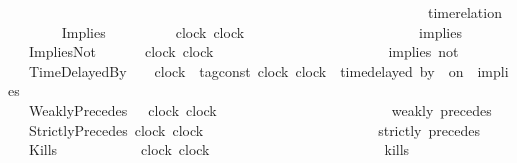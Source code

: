 \begin{isabellebody}
\ \ \ \ \ \ \ \ \ \ \ \ \ \ \ \ \ \ \ \ \ \ \ \ \ \ \ \ \ \ \ \ \ \ \ \ \ \ \ \ \ \ \ \ \ \ \ \ \ \ \ \ \ \ \ \ \ \ \ \ {\isacharparenleft}{\isachardoublequoteopen}time{\isacharminus}relation\ {\isasymlfloor}{\isacharunderscore}{\isacharcomma}\ {\isacharunderscore}{\isasymrfloor}\ {\isasymin}\ {\isacharunderscore}{\isachardoublequoteclose}\ {}{}{\isacharparenright}\isanewline
\ \ {\isacharbar}\ Implies\ \ \ \ \ \ \ \ \ \ {\isacartoucheopen}clock{\isacartoucheclose}\ {\isacartoucheopen}clock{\isacartoucheclose}\ \ \ \ \ \ \ \ \ \ \ \ \ \ \ \ \ \ \ \ \ \ \ \ {\isacharparenleft}\ {\isachardoublequoteopen}implies{\isachardoublequoteclose}\ {}{}{\isacharparenright}\isanewline
\ \ {\isacharbar}\ ImpliesNot\ \ \ \ \ \ \ {\isacartoucheopen}clock{\isacartoucheclose}\ {\isacartoucheopen}clock{\isacartoucheclose}\ \ \ \ \ \ \ \ \ \ \ \ \ \ \ \ \ \ \ \ \ \ \ \ {\isacharparenleft}\ {\isachardoublequoteopen}implies\ not{\isachardoublequoteclose}\ {}{}{\isacharparenright}\isanewline
\ \ {\isacharbar}\ TimeDelayedBy\ \ \ \ {\isacartoucheopen}clock{\isacartoucheclose}\ {\isacartoucheopen}{\isacharprime}{\isasymtau}\ tag{\isacharunderscore}const{\isacartoucheclose}\ {\isacartoucheopen}clock{\isacartoucheclose}\ {\isacartoucheopen}clock{\isacartoucheclose}\ {\isacharparenleft}{\isachardoublequoteopen}{\isacharunderscore}\ time{\isacharminus}delayed\ by\ {\isacharunderscore}\ on\ {\isacharunderscore}\ implies\ {\isacharunderscore}{\isachardoublequoteclose}\ {}{}{\isacharparenright}\isanewline
\ \ {\isacharbar}\ WeaklyPrecedes\ \ \ {\isacartoucheopen}clock{\isacartoucheclose}\ {\isacartoucheopen}clock{\isacartoucheclose}\ \ \ \ \ \ \ \ \ \ \ \ \ \ \ \ \ \ \ \ \ \ \ \ {\isacharparenleft}\ {\isachardoublequoteopen}weakly\ precedes{\isachardoublequoteclose}\ {}{}{\isacharparenright}\isanewline
\ \ {\isacharbar}\ StrictlyPrecedes\ {\isacartoucheopen}clock{\isacartoucheclose}\ {\isacartoucheopen}clock{\isacartoucheclose}\ \ \ \ \ \ \ \ \ \ \ \ \ \ \ \ \ \ \ \ \ \ \ \ {\isacharparenleft}\ {\isachardoublequoteopen}strictly\ precedes{\isachardoublequoteclose}\ {}{}{\isacharparenright}\isanewline
\ \ {\isacharbar}\ Kills\ \ \ \ \ \ \ \ \ \ \ \ {\isacartoucheopen}clock{\isacartoucheclose}\ {\isacartoucheopen}clock{\isacartoucheclose}\ \ \ \ \ \ \ \ \ \ \ \ \ \ \ \ \ \ \ \ \ \ \ \ {\isacharparenleft}\ {\isachardoublequoteopen}kills{\isachardoublequoteclose}\ {}{}{\isacharparenright}%

\end{isabellebody}

